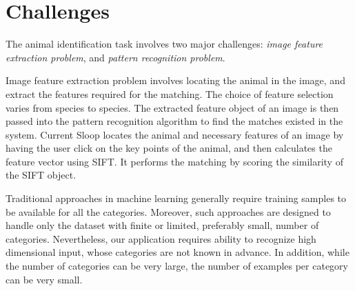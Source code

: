 \section{Challenges}

The animal identification task involves two major challenges: \emph{image feature extraction problem}, and \emph{pattern recognition problem}. 

Image feature extraction problem involves locating the animal in the image, and extract the features required for the matching. The choice of feature selection varies from species to species. The extracted feature object of an image is then passed into the pattern recognition algorithm to find the matches existed in the system. Current Sloop locates the animal and necessary features of an image by having the user click on the key points of the animal, and then calculates the feature vector using SIFT. It performs the matching by scoring the similarity of the SIFT object. 

Traditional approaches in machine learning generally require training samples to be available for all the categories. Moreover, such approaches are designed to handle only the dataset with finite or limited, preferably small, number of categories. Nevertheless, our application requires ability to recognize high dimensional input, whose categories are not known in advance. In addition, while the number of categories can be very large, the number of examples per category can be very small.

